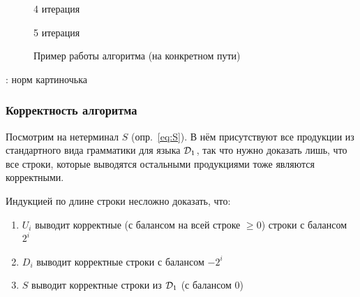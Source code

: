 \begin{figure}[H]
\begin{minipage}[h]{0.47\linewidth}
    \end{minipage}
    \vfill
    \begin{minipage}[h]{0.47\linewidth}
         4 итерация
    \end{minipage}
    \hfill
    \begin{minipage}[h]{0.47\linewidth}
         5 итерация
    \end{minipage}

    \caption{Пример работы алгоритма (на конкретном пути)}
    \label{img:dyck1_example}
\end{figure}

\TODO: норм картиночька

\subsubsection{Корректность алгоритма}

Посмотрим на нетерминал $S$ (опр.~\ref{eq:S}). В нём присутствуют все продукции из стандартного вида грамматики для языка $\mathcal{D}_1$, так что нужно доказать лишь, что все строки, которые выводятся остальными продукциями тоже являются корректными. 

Индукцией по длине строки несложно доказать, что:

\vspace{-\topsep}
\begin{enumerate}
  \setlength\itemsep{-0.1em}
  \item $U_i$ выводит корректные (с балансом на всей строке $\ge 0$) строки с балансом $2^{i}$
  \item $D_i$ выводит корректные строки с балансом $-2^{i}$
  \item $S$ выводит корректные строки из $\mathcal{D}_1$ (с балансом 0)
\end{enumerate}

